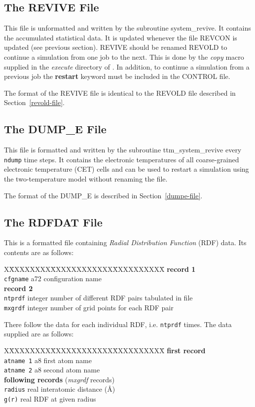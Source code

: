 \subsection{The REVIVE File}
\label{revive-file}

This file is unformatted and written by the subroutine {\sc
system\_revive}.  It contains the accumulated statistical data. It
is updated whenever the file REVCON is updated (see previous
section).  REVIVE should be renamed REVOLD to continue a
simulation from one job to the next.  This is done by the {\sl
copy} macro supplied in the {\em execute} directory of \D.  In
addition, to continue a simulation from a previous job the {\bf
restart} keyword must be included in the CONTROL file.

The format of the REVIVE file is identical to the REVOLD file
described in Section~\ref{revold-file}.

\subsection{The DUMP\_E File}

This file is formatted and written by the subroutine
{\sc ttm\_system\_revive} every {\tt ndump} time steps.  It
contains the electronic temperatures of all coarse-grained
electronic temperature (CET) cells and can be used to
restart a simulation using the 
two-temperature model without renaming the file.

The format of the DUMP\_E is described in
Section~\ref{dumpe-file}.

\subsection{The RDFDAT File}
\label{rdf-file}

This is a formatted file containing {\em Radial Distribution
Function} (RDF) data.  Its contents are as follows:
\begin{tabbing}
X\=XXXXXXXX\=XXXXXXXXXXXX\=XXXXXXXXXX\=\kill
{\bf record 1} \\
\> {\tt cfgname} \> a72     \> configuration name \\
{\bf record 2} \\
\> {\tt ntprdf}  \> integer \> number of different RDF pairs tabulated in file \\
\> {\tt mxgrdf}  \> integer \> number of grid points for each RDF pair
\end{tabbing}
There follow the data for each individual RDF, i.e. {\tt ntprdf}
times.  The data supplied are as follows:
\begin{tabbing}
X\=XXXXXXXX\=XXXXXXXXXXXX\=XXXXXXXXXX\=\kill
{\bf first record} \\
\> {\tt atname 1} \> a8   \> first atom name \\
\> {\tt atname 2} \> a8   \> second atom name \\
{\bf following records} ({\em mxgrdf} records) \\
\> {\tt radius}   \> real \> interatomic distance (\AA) \\
\> {\tt g(r)}     \> real \> RDF at given radius
\end{tabbing}

